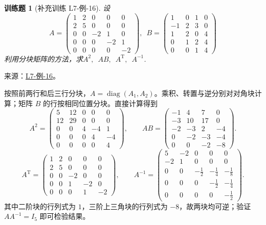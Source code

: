 \documentclass[12pt,fontset=fandol]{ctexart}
\newtheorem{exercise}{训练题}[section]
\begin{document}
\begin{exercise}[补充训练 L7-例-16]\label{prob:L7-例-16}
设\[A=\begin{pmatrix}
            1 & 2 & 0  & 0  & 0  \\
            2 & 5 & 0  & 0  & 0  \\
            0 & 0 & -2 & 1  & 0  \\
            0 & 0 & 0  & -2 & 1  \\
            0 & 0 & 0  & 0  & -2
        \end{pmatrix},\enspace B=\begin{pmatrix}
            1  & 0 & 1 & 0 \\
            -1 & 2 & 3 & 0 \\
            1  & 2 & 0 & 4 \\
            0  & 1 & 2 & 4 \\
            0  & 0 & 1 & 4
        \end{pmatrix}\]
    利用分块矩阵的方法，求$A^2,\enspace AB,\enspace A^\mathrm{T},\enspace A^{-1}$.
\end{exercise}
\noindent 来源：\href{https://github.com/yhwu-is/Linear-Algebra-Left-Undone/blob/new/%E8%AE%B2%E4%B9%89/%E4%B8%93%E9%A2%98/7%20%E7%BA%BF%E6%80%A7%E6%98%A0%E5%B0%84%E7%9F%A9%E9%98%B5%E8%A1%A8%E7%A4%BA%E4%B8%8E%E7%9F%A9%E9%98%B5%E8%BF%90%E7%AE%97%E5%9F%BA%E7%A1%80.tex}{L7-例-16}。
\begin{solve}
按照前两行和后三行分块，$A=\operatorname{diag}(A_1,A_2)$。乘积、转置与逆分别对对角块计算；矩阵 $B$ 的行按相同位置分块。直接计算得到
\[A^2=\begin{pmatrix}5&12&0&0&0\\12&29&0&0&0\\0&0&4&-4&1\\0&0&0&4&-4\\0&0&0&0&4\end{pmatrix},\qquad AB=\begin{pmatrix}-1&4&7&0\\-3&10&17&0\\-2&-3&2&-4\\0&-2&-3&-4\\0&0&-2&-8\end{pmatrix}.\]
\[A^{\mathrm T}=\begin{pmatrix}1&2&0&0&0\\2&5&0&0&0\\0&0&-2&0&0\\0&0&1&-2&0\\0&0&0&1&-2\end{pmatrix},\qquad A^{-1}=\begin{pmatrix}5&-2&0&0&0\\-2&1&0&0&0\\0&0&-\frac{1}{2}&-\frac{1}{4}&-\frac{1}{8}\\0&0&0&-\frac{1}{2}&-\frac{1}{4}\\0&0&0&0&-\frac{1}{2}\end{pmatrix}.\]
其中二阶块的行列式为 $1$，三阶上三角块的行列式为 $-8$，故两块均可逆；验证 $AA^{-1}=I_5$ 即可检验结果。
\end{solve}
\end{document}
